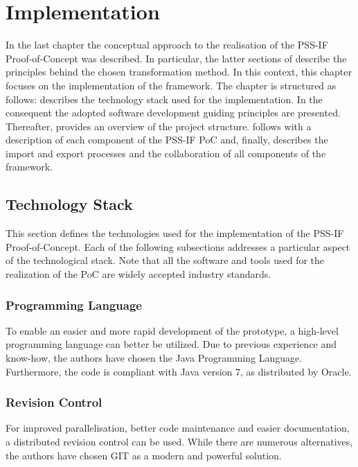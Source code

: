 \chapter{Implementation}
\label{chap:impl}

In the last chapter the conceptual approach to the realisation of the PSS-IF Proof-of-Concept was described. In particular, the latter sections of  describe the principles behind the chosen transformation method. In this context, this chapter focuses on the implementation of the framework. The chapter is structured as follows:  describes the technology stack used for the implementation. In the consequent  the adopted software development guiding principles are presented. Thereafter,  provides an overview of the project structure.  follows with a description of each component of the PSS-IF PoC and, finally,  describes the import and export processes and the collaboration of all components of the framework.

\section{Technology Stack}
\label{sec:impl:technology}

This section defines the technologies used for the implementation of the PSS-IF Proof-of-Concept. Each of the following subsections addresses a particular aspect of the technological stack. Note that all the software and tools used for the realization of the PoC are widely accepted industry standards.

\subsection{Programming Language}

To enable an easier and more rapid development of the prototype, a high-level programming language can better be utilized. Due to previous experience and know-how, the authors have chosen the Java Programming Language. Furthermore, the code is compliant with Java version 7, as distributed by Oracle. 

\subsection{Revision Control}

For improved parallelisation, better code maintenance and easier documentation, a distributed revision control can be used. While there are numerous alternatives, the authors have chosen GIT as a modern and powerful solution.

